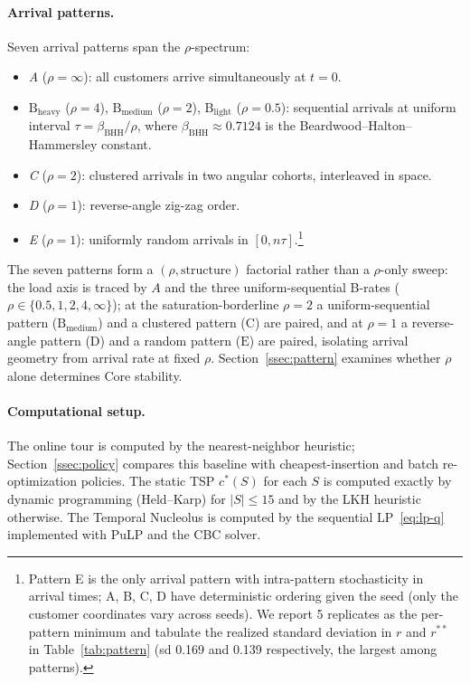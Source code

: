 \documentclass[11pt]{article}
\theoremstyle{plain}
\theoremstyle{definition}
\theoremstyle{remark}
\newcommand{\cstar}{c^{\ast}}
\begin{document}
\paragraph{Arrival patterns.} Seven arrival patterns span the $\rho$-spectrum:
\begin{itemize}
  \item \emph{A} ($\rho=\infty$): all customers arrive simultaneously at $t=0$.
  \item \emph{$\text{B}_{\text{heavy}}$} ($\rho=4$), \emph{$\text{B}_{\text{medium}}$} ($\rho=2$), \emph{$\text{B}_{\text{light}}$} ($\rho=0.5$): sequential arrivals at uniform interval $\tau=\beta_{\mathrm{BHH}}/\rho$, where $\beta_{\mathrm{BHH}}\approx 0.7124$ is the Beardwood--Halton--Hammersley constant.
  \item \emph{C} ($\rho=2$): clustered arrivals in two angular cohorts, interleaved in space.
  \item \emph{D} ($\rho=1$): reverse-angle zig-zag order.
  \item \emph{E} ($\rho=1$): uniformly random arrivals in $[0,n\tau]$.\footnote{Pattern E is the only arrival pattern with intra-pattern stochasticity in arrival times; A, B, C, D have deterministic ordering given the seed (only the customer coordinates vary across seeds). We report 5 replicates as the per-pattern minimum and tabulate the realized standard deviation in $r$ and $r^{\ast\ast}$ in Table~\ref{tab:pattern} (sd 0.169 and 0.139 respectively, the largest among patterns).}
\end{itemize}
The seven patterns form a $(\rho,\text{structure})$ factorial rather than a $\rho$-only sweep: the load axis is traced by $A$ and the three uniform-sequential B-rates ($\rho\in\{0.5,1,2,4,\infty\}$); at the saturation-borderline $\rho=2$ a uniform-sequential pattern ($\text{B}_{\text{medium}}$) and a clustered pattern ($\text{C}$) are paired, and at $\rho=1$ a reverse-angle pattern ($\text{D}$) and a random pattern ($\text{E}$) are paired, isolating arrival geometry from arrival rate at fixed $\rho$. Section~\ref{ssec:pattern} examines whether $\rho$ alone determines Core stability.

\paragraph{Computational setup.} The online tour is computed by the nearest-neighbor heuristic; Section~\ref{ssec:policy} compares this baseline with cheapest-insertion and batch re-optimization policies. The static TSP $\cstar(S)$ for each $S$ is computed exactly by dynamic programming (Held--Karp) for $|S|\le 15$ and by the LKH heuristic \citep{helsgaun2000effective} otherwise. The Temporal Nucleolus is computed by the sequential LP~\eqref{eq:lp-q} implemented with PuLP and the CBC solver.
\end{document}
